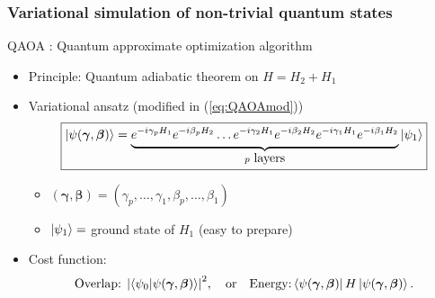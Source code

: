 \documentclass{beamer}
\theoremstyle{definition}
\begin{document}
\begin{frame}
\frametitle{Variational simulation of non-trivial quantum states}

QAOA \cite{QAOA}: Quantum approximate optimization algorithm

\pause

\begin{itemize}
	\item Principle: Quantum adiabatic theorem on $H = H_2 + H_1$

	\pause
	
	\item Variational ansatz (modified in (\ref{eq:QAOAmod}))
	\begin{equation}\label{eq:QAOA}
	\boxed{\left\vert{\psi(\bm{\gamma}, \bm{\beta})}\right\rangle = \underbrace{ \strut {e^{-i\gamma_p H_1}e^{-i\beta_p H_2}} \dots {e^{-i\gamma_2 H_1}e^{-i\beta_2 H_2}} {e^{-i\gamma_1 H_1}e^{-i\beta_1 H_2}}}_{ p \mbox{ layers}} \left\vert{\psi_1}\right\rangle}
	\end{equation}
	\begin{itemize}
		\item $(\bm\gamma,\bm\beta) = (\gamma_p,\dots, \gamma_1,\beta_p,\dots, \beta_1)$
		
		\item $\left\vert{\psi_1}\right\rangle = $ ground state of $H_1$ (easy to prepare)
	\end{itemize}

    \pause
	
	\item Cost function:
	\begin{equation*}
	\text{Overlap: } \abs{\braket{\psi_0}{\psi(\bm\gamma,\bm\beta)}}^2 ,\quad \text{or} \quad \text{Energy:} \left\langle{\psi(\bm\gamma,\bm\beta)}\right\vert H\left\vert{\psi(\bm\gamma,\bm\beta)}\right\rangle.
	\end{equation*}
\end{itemize}


\end{frame}

\end{document}
